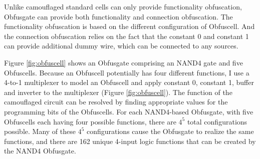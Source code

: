 \documentclass[thesis]{umassthesis}  %
\begin{document}
Unlike camouflaged standard cells can only provide functionality obfuscation, Obfusgate can provide both functionality and connection obfuscation. The functionality obfuscation is based on the different configuration of Obfuscell. And the connection obfuscation relies on the fact that the constant 0 and constant 1 can provide additional dummy wire, which can be connected to any sources.

Figure \ref{fig:obfuscell} shows an Obfusgate comprising an NAND4 gate and five Obfuscells. Because an Obfuscell potentially has four different functions, I use a 4-to-1 multiplexer to model an Obfuscell and apply constant 0, constant 1, buffer and inverter to the multiplexer (Figure \ref{fig:obfuscell}). The function of the camouflaged circuit can be resolved by finding appropriate values for the programming bits of the Obfuscells. For each NAND4-based Obfusgate, with five Obfuscells each having four possible functions, there are $4^{5}$ total configurations possible. Many of these $4^{5}$ configurations cause the Obfusgate to realize the same functions, and there are 162 unique 4-input logic functions that can be created by the NAND4 Obfusgate.


\end{document}
